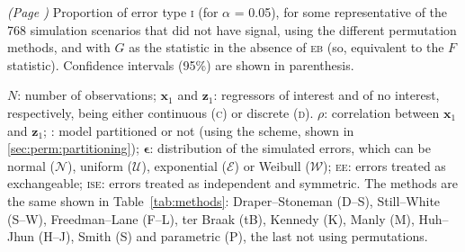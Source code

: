\begin{table}[b!]
\caption[Amount of error type \textsc{i} for representative simulation scenarios.]{\emph{(Page \pageref{tab:methods_resultsT})} Proportion of error type \textsc{i} (for $\alpha$ = 0.05), for some representative of the 768 simulation scenarios that did not have signal, using the different permutation methods, and with $G$ as the statistic in the absence of \textsc{eb} (so, equivalent to the $F$ statistic). Confidence intervals (95\%) are shown in parenthesis.}
{\footnotesize
$N$: number of observations;
$\mathbf{x}_1$ and $\mathbf{z}_1$: regressors of interest and of no interest, respectively, being either continuous (\textsc{c}) or discrete (\textsc{d}).
$\rho$: correlation between $\mathbf{x}_1$ and $\mathbf{z}_1$;
: model partitioned or not (using the \citet{Beckmann2001} scheme, shown in \ref{sec:perm:partitioning});
$\mathbf{\epsilon}$: distribution of the simulated errors, which can be normal ($\mathcal{N}$), uniform ($\mathcal{U}$), exponential ($\mathcal{E}$) or Weibull ($\mathcal{W}$);
\textsc{ee}: errors treated as exchangeable;
\textsc{ise}: errors treated as independent and symmetric.
The methods are the same shown in Table~\ref{tab:methods}: Draper--Stoneman (D--S), Still--White (S--W), Freedman--Lane (F--L), ter Braak (tB), Kennedy (K), Manly (M), Huh--Jhun (H--J), Smith (S) and parametric (P), the last not using permutations.
\par}
\label{tab:methods_resultsC}
\end{table}


